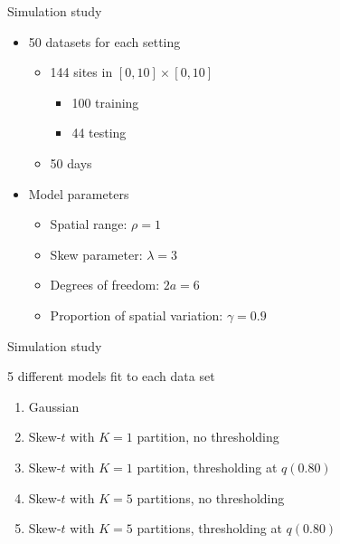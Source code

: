 \documentclass{beamer}
\begin{document}
\begin{frame}{Simulation study}
  \begin{itemize} \setlength{\itemsep}{1em}
    \item 50 datasets for each setting \vspace{0.5em}
    \begin{itemize} \setlength{\itemsep}{0.5em}
      \item 144 sites in $[0, 10] \times [0, 10]$ \vspace{0.25em}
      \begin{itemize} \setlength{\itemsep}{0.25em}
        \item 100 training
        \item 44 testing
      \end{itemize}
      \item 50 days
    \end{itemize}
    \item Model parameters \vspace{0.5em}
    \begin{itemize} \setlength{\itemsep}{0.5em}
      \item Spatial range: $\rho = 1$
      \item Skew parameter: $\lambda = 3$
      \item Degrees of freedom: $2a = 6$
      \item Proportion of spatial variation: $\gamma = 0.9$
    \end{itemize}
  \end{itemize}
\end{frame}

\begin{frame}{Simulation study}
\begin{adjustwidth}{1em}{0em}
  5 different models fit to each data set \vspace{0.5em}
  \begin{enumerate}[1.] \setlength{\itemsep}{0.5em}
    \item Gaussian
    \item Skew-$t$ with $K = 1$ partition, no thresholding
    \item Skew-$t$ with $K = 1$ partition, thresholding at $q(0.80)$
    \item Skew-$t$ with $K = 5$ partitions, no thresholding
    \item Skew-$t$ with $K = 5$ partitions, thresholding at $q(0.80)$
  \end{enumerate}
\end{adjustwidth}
\end{frame}
\end{document}
